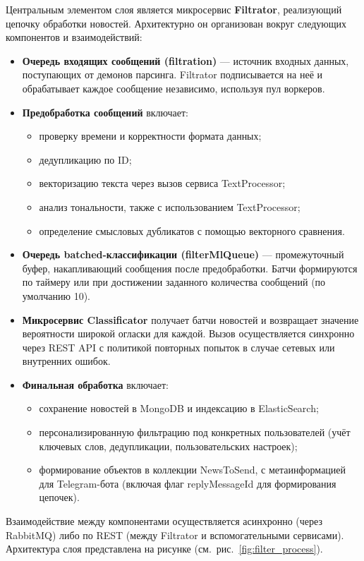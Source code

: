 Центральным элементом слоя является микросервис \textbf{Filtrator}, реализующий цепочку обработки новостей.
Архитектурно он организован вокруг следующих компонентов и взаимодействий:
\begin{itemize}
    \item \textbf{Очередь входящих сообщений (filtration)} — источник входных данных, поступающих от демонов парсинга.
    Filtrator подписывается на неё и обрабатывает каждое сообщение независимо, используя пул воркеров.
    \item \textbf{Предобработка сообщений} включает:
    \begin{itemize}
        \item проверку времени и корректности формата данных;
        \item дедупликацию по ID;
        \item векторизацию текста через вызов сервиса TextProcessor;
        \item анализ тональности, также с использованием TextProcessor;
        \item определение смысловых дубликатов с помощью векторного сравнения.
    \end{itemize}
    \item \textbf{Очередь batched-классификации (filterMlQueue)} — промежуточный буфер, накапливающий сообщения после предобработки.
    Батчи формируются по таймеру или при достижении заданного количества сообщений (по умолчанию 10).
    \item \textbf{Микросервис Classificator} получает батчи новостей и возвращает значение вероятности широкой огласки для каждой.
    Вызов осуществляется синхронно через REST API с политикой повторных попыток в случае сетевых или внутренних ошибок.
    \item \textbf{Финальная обработка} включает:
    \begin{itemize}
        \item сохранение новостей в MongoDB и индексацию в ElasticSearch;
        \item персонализированную фильтрацию под конкретных пользователей (учёт ключевых слов, дедупликации, пользовательских настроек);
        \item формирование объектов в коллекции NewsToSend, с метаинформацией для Telegram-бота (включая флаг replyMessageId для формирования цепочек).
    \end{itemize}
\end{itemize}

Взаимодействие между компонентами осуществляется асинхронно (через RabbitMQ) либо по REST (между Filtrator и вспомогательными сервисами).
Архитектура слоя представлена на рисунке (см.\ рис.~\ref{fig:filter_process}).

